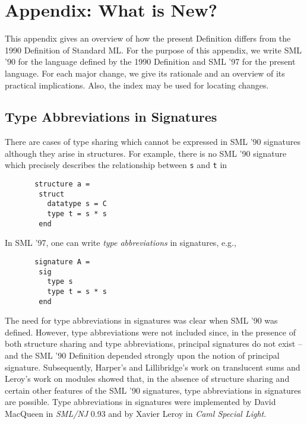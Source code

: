 %
%

%
%
\section{Appendix: What is New?}
\label{whatisnew-app}
This appendix gives an overview of how the present Definition
differs from the 1990 Definition of Standard ML\cite{mth90}. 
For the purpose of this appendix, we write SML '90 for the 
language defined by the 1990 Definition and SML '97 for the
present language. 
For each major change, we give its rationale and an overview
of its practical implications. Also, the index
may be used for locating changes.


\subsection{Type Abbreviations in Signatures}
\label{typabbr.sec}
There are cases of type sharing which cannot be expressed
in SML '90 signatures although they arise in structures. For example,
there is no SML '90 signature which precisely describes the relationship
between {\tt s} and {\tt t} in
\begin{verbatim}
       structure a =
        struct
          datatype s = C 
          type t = s * s
        end
\end{verbatim}
In SML '97, one can write {\sl type abbreviations} in signatures, e.g.,
\begin{verbatim}
       signature A =
        sig
          type s 
          type t = s * s
        end
\end{verbatim}
The need for type abbreviations in signatures was clear when SML '90 was 
defined. However, type abbreviations were not included since, in the 
presence of both structure sharing and type abbreviations, principal 
signatures do not exist\cite{mt91} -- and the SML '90 Definition 
depended strongly upon the notion of principal signature.
Subsequently, Harper's and Lillibridge's work on translucent sums\cite{hl94} 
and Leroy's work on modules\cite{leroy94} showed that, in the absence of 
structure sharing and certain other features of the SML '90 signatures, 
type abbreviations in signatures are possible. 
Type abbreviations in signatures were implemented by 
David MacQueen in {\em SML/NJ} 0.93 and by Xavier Leroy in
{\em Caml Special Light\/}\cite{Caml-Special-Light}.

